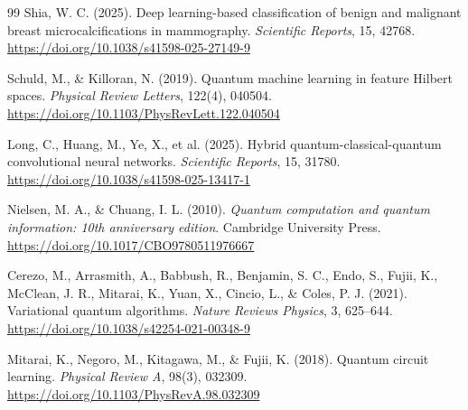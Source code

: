 \begin{thebibliography}{99}
    Shia, W. C. (2025). Deep learning-based classification of benign and malignant breast microcalcifications in
    mammography. \textit{Scientific Reports}, 15, 42768.
    \url{https://doi.org/10.1038/s41598-025-27149-9}

    Schuld, M., \& Killoran, N. (2019). Quantum machine learning in feature {H}ilbert spaces.
    \textit{Physical Review Letters}, 122(4), 040504.
    \url{https://doi.org/10.1103/PhysRevLett.122.040504}

    Long, C., Huang, M., Ye, X., et al. (2025). Hybrid quantum-classical-quantum convolutional neural networks.
    \textit{Scientific Reports}, 15, 31780.
    \url{https://doi.org/10.1038/s41598-025-13417-1}


    Nielsen, M. A., \& Chuang, I. L. (2010). \textit{Quantum computation and quantum information: 10th anniversary edition}.
    Cambridge University Press. \url{https://doi.org/10.1017/CBO9780511976667}

    Cerezo, M., Arrasmith, A., Babbush, R., Benjamin, S. C., Endo, S., Fujii, K., McClean, J. R., Mitarai, K., Yuan, X., Cincio, L., \& Coles, P. J. (2021). Variational quantum algorithms. \textit{Nature Reviews Physics}, 3, 625--644. \url{https://doi.org/10.1038/s42254-021-00348-9}

    Mitarai, K., Negoro, M., Kitagawa, M., \& Fujii, K. (2018). Quantum circuit learning. \textit{Physical Review A}, 98(3), 032309. \url{https://doi.org/10.1103/PhysRevA.98.032309}


\end{thebibliography}

